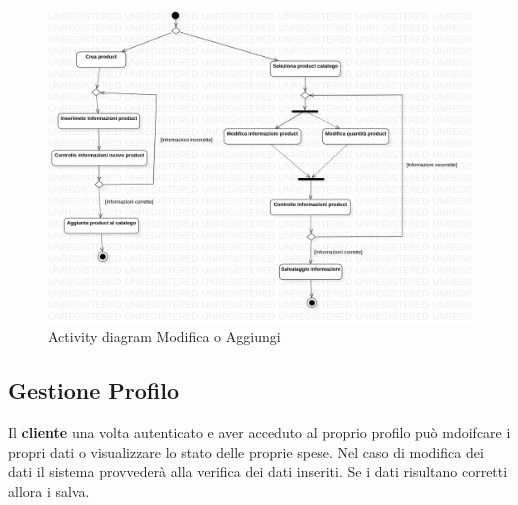 \documentclass[12pt, a4paper]{report}
\begin{document}
\begin{figure}[h]
  \centering
  \includegraphics[width=\textwidth]{Use Case Model!Gestione prodotti!ActivityGestioneProdotti!ActivityDiagramGestioneProdotti_10.png}
  \caption{Activity diagram Modifica o Aggiungi}
\end{figure}

\newpage

\subsection{Gestione Profilo}

Il \textbf{cliente} una volta autenticato e aver acceduto al proprio profilo può mdoifcare i propri dati o visualizzare lo stato delle proprie spese.
Nel caso di modifica dei dati il sistema provvederà alla verifica dei dati inseriti. Se i dati risultano corretti allora i salva.
\end{document}
